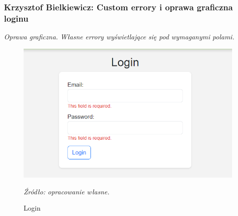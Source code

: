 \documentclass[12pt,a4paper,oneside]{article}
\theoremstyle{definition}
\numberwithin{equation}{section}
\begin{document}
\subsubsection{Krzysztof Bielkiewicz: Custom errory i oprawa graficzna loginu}
\label{1.3.18}
\textit{Oprawa graficzna. Własne errory wyświetlające się pod wymaganymi polami.}

\begin{figure}[H]
    \centering
    \includegraphics[width=0.8\columnwidth]{images/krzysztofBImages/register-login/login.png}
    \caption{Login}
    \emph{Źródło: opracowanie własne.}
\end{figure}



\end{document}
